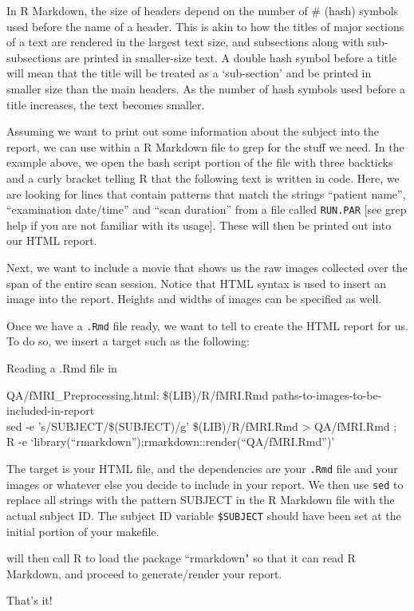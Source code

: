 In R Markdown, the size of headers depend on the number of \# (hash) symbols used before the name of a header. This is akin to how the titles of major sections of a text are rendered in the largest text size, and subsections along with sub-subsections are printed in smaller-size text. A double hash symbol before a title will mean that the title will be treated as a `sub-section' and be printed in smaller size than the main headers. As the number of hash symbols used before a title increases, the text becomes smaller.


Assuming we want to print out some information about the subject into the report, we can use \bashn{} within a R Markdown file to grep for the stuff we need. In the example above, we open the bash script portion of the file with three backticks and a curly bracket telling R that the following text is written in \bashn{} code. Here, we are looking for lines that contain patterns that match the strings ``patient name'', ``examination date/time'' and ``scan duration'' from a file called \texttt{RUN.PAR} [see grep help if you are not familiar with its usage]. These will then be printed out into our HTML report.

Next, we want to include a movie that shows us the raw images collected over the span of the entire scan session. Notice that HTML syntax is used to insert an image into the report. Heights and widths of images can be specified as well. 

Once we have a \texttt{.Rmd} file ready, we want to tell \maken{} to create the HTML report for us. To do so, we insert a target such as the following:

\begin{make}{Reading a .Rmd file in \maken{}}
	
	QA/fMRI_Preprocessing.html: \$(LIB)/R/fMRI.Rmd paths-to-images-to-be-included-in-report \\
	\tab sed -e 's/SUBJECT/\$(SUBJECT)/g' \$(LIB)/R/fMRI.Rmd > QA/fMRI.Rmd ;\ \\
	\tab R -e `library(``rmarkdown'');rmarkdown::render(``QA/fMRI.Rmd'')' \\
\end{make}

The target is your HTML file, and the dependencies are your \texttt{.Rmd} file and your images or whatever else you decide to include in your report. We then use \texttt{sed} to replace all strings with the pattern SUBJECT in the R Markdown file with the actual subject ID. The subject ID variable \texttt{\$SUBJECT} should have been set at the initial portion of your makefile. 

\maken{} will then call R to load the package ``rmarkdown" so that it can read R Markdown, and proceed to generate/render your report.

That's it! 













